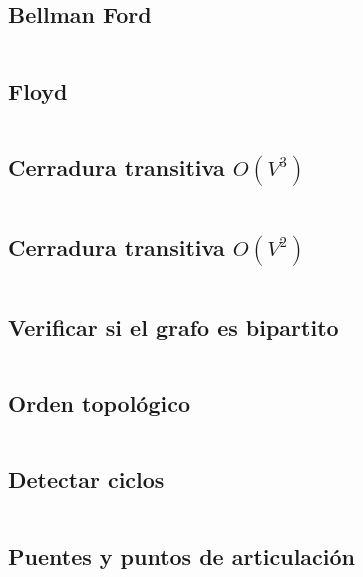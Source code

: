\documentclass[11pt]{article}
\begin{document}
		\subsection{Bellman Ford}
		\inputminted[tabsize=2,breaklines,firstline=127,lastline=161,fontsize=\small]{c++}{graph.cpp}
		
		\subsection{Floyd}
		\inputminted[tabsize=2,breaklines,firstline=167,lastline=175,fontsize=\small]{c++}{graph.cpp}
		
		\subsection{Cerradura transitiva $O(V^3)$}
		\inputminted[tabsize=2,breaklines,firstline=177,lastline=184,fontsize=\small]{c++}{graph.cpp}
		
		\subsection{Cerradura transitiva $O(V^2)$}
		\inputminted[tabsize=2,breaklines,firstline=186,lastline=200,fontsize=\small]{c++}{graph.cpp}
		
		\subsection{Verificar si el grafo es bipartito}
		\inputminted[tabsize=2,breaklines,firstline=202,lastline=224,fontsize=\small]{c++}{graph.cpp}
		
		\subsection{Orden topológico}
		\inputminted[tabsize=2,breaklines,firstline=226,lastline=252,fontsize=\small]{c++}{graph.cpp}

		\subsection{Detectar ciclos}
		\inputminted[tabsize=2,breaklines,firstline=254,lastline=274,fontsize=\small]{c++}{graph.cpp}
		
		\subsection{Puentes y puntos de articulación}
		\inputminted[tabsize=2,breaklines,firstline=276,lastline=304,fontsize=\small]{c++}{graph.cpp}
		
\end{document}
